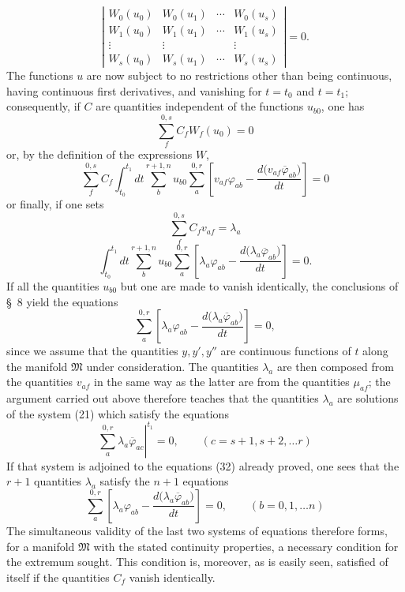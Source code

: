 \documentclass[11pt,a4paper,leqno]{article}
\begin{document}
\[
\left|
\begin{matrix}
W_0(u_0)&W_0(u_1)&\cdots&W_0(u_s)\\
W_1(u_0)&W_1(u_1)&\cdots&W_1(u_s)\\
\vdots&\vdots&&\vdots\\
W_s(u_0)&W_s(u_1)&\cdots&W_s(u_s)
\end{matrix}
\right|=0.
\]
The functions $u$ are now subject to no restrictions other than being continuous, having continuous first derivatives, and vanishing for $t=t_0$ and $t=t_1$; consequently, if $C$ are quantities independent of the functions $u_{b0}$, one has
\[
\sum_f^{0,s}C_fW_f(u_0)=0
\]
or, by the definition of the expressions $W$,
\[
\sum_f^{0,s}C_f
\int_{t_0}^{t_1}dt\sum_b^{r+1,n}u_{b0}\sum_a^{0,r}
\left[
v_{af}\varphi_{ab}-\frac{d\bigl(v_{af}\overline{\varphi}_{ab}\bigr)}{dt}
\right]=0
\]
or finally, if one sets
\[
\sum_f^{0,s}C_fv_{af}=\lambda_a
\]
\[
\int_{t_0}^{t_1}dt\sum_b^{r+1,n}u_{b0}\sum_a^{0,r}
\left[
\lambda_a\varphi_{ab}-\frac{d\bigl(\lambda_a\overline{\varphi}_{ab}\bigr)}{dt}
\right]=0.
\]
If all the quantities $u_{b0}$ but one are made to vanish identically, the conclusions of \S~8 yield the equations
\begin{equation}\tag{32}
\sum_a^{0,r}
\left[
\lambda_a\varphi_{ab}-\frac{d\bigl(\lambda_a\overline{\varphi}_{ab}\bigr)}{dt}
\right]=0,
\end{equation}
since we assume that the quantities $y,y',y''$ are continuous functions of $t$ along the manifold $\mathfrak M$ under consideration. The quantities $\lambda_a$ are then composed from the quantities $v_{af}$ in the same way as the latter are from the quantities $\mu_{af}$; the argument carried out above therefore teaches that the quantities $\lambda_a$ are solutions of the system (21) which satisfy the equations
\begin{equation}\tag{33}
\left.\sum_a^{0,r}\lambda_a\overline{\varphi}_{ac}\right|^{t_1}=0,
\qquad(c=s+1,s+2,\ldots r)
\end{equation}
If that system is adjoined to the equations (32) already proved, one sees that the $r+1$ quantities $\lambda_a$ satisfy the $n+1$ equations
\begin{equation}\tag{34}
\sum_a^{0,r}
\left[
\lambda_a\varphi_{ab}-\frac{d\bigl(\lambda_a\overline{\varphi}_{ab}\bigr)}{dt}
\right]=0,
\qquad(b=0,1,\ldots n)
\end{equation}
The simultaneous validity of the last two systems of equations therefore forms, for a manifold $\mathfrak M$ with the stated continuity properties, a necessary condition for the extremum sought. This condition is, moreover, as is easily seen, satisfied of itself if the quantities $C_f$ vanish identically.
\end{document}
